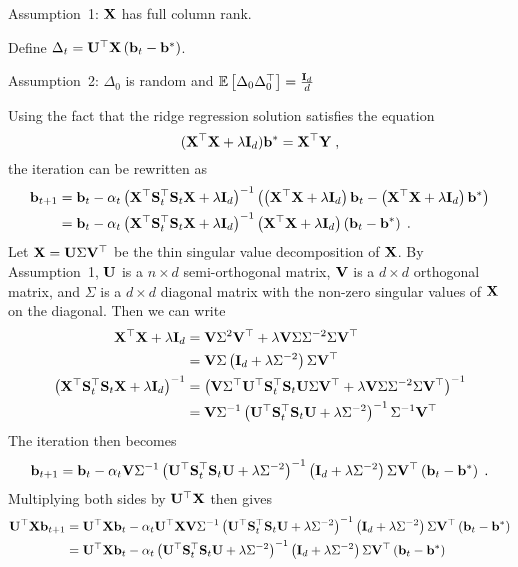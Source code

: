 \todo

Assumption~1: $\mathbf{X}$ has full column rank.

Define $\Delta_t=\mathbf{U}^\top\mathbf{X}\left(\mathbf{b}_t-\mathbf{b}^*\right)$.

Assumption~2: $\Delta_0$ is random and $\mathbb{E}\left[\Delta_0\Delta_0^\top\right]=\frac{\mathbf{I}_d}{d}$


Using the fact that the ridge regression solution satisfies the equation
\[
(\mathbf{X}^\top\mathbf{X} + \lambda\mathbf{I}_d)\mathbf{b}^* = \mathbf{X}^\top\mathbf{Y} \;,
\]
the \todo iteration can be rewritten as
\begin{align*}
\mathbf{b}_{t+1} &= \mathbf{b}_t - \alpha_t\left(\mathbf{X}^\top\mathbf{S}_t^\top\mathbf{S}_t\mathbf{X} + \lambda\mathbf{I}_d\right)^{-1}\left(\left(\mathbf{X}^\top\mathbf{X}+\lambda\mathbf{I}_d\right)\mathbf{b}_t-\left(\mathbf{X}^\top\mathbf{X}+\lambda\mathbf{I}_d\right)\mathbf{b}^*\right) \\
&= \mathbf{b}_t - \alpha_t\left(\mathbf{X}^\top\mathbf{S}_t^\top\mathbf{S}_t\mathbf{X} + \lambda\mathbf{I}_d\right)^{-1}\left(\mathbf{X}^\top\mathbf{X}+\lambda\mathbf{I}_d\right)\left(\mathbf{b}_t-\mathbf{b}^*\right) \;.
\end{align*}
Let $\mathbf{X} = \mathbf{U}\Sigma\mathbf{V}^\top$ be the thin singular value decomposition of $\mathbf{X}$. By Assumption~1, $\mathbf{U}$ is a $n\times d$ semi-orthogonal matrix, $\mathbf{V}$ is a $d\times d$ orthogonal matrix, and $\Sigma$ is a $d\times d$ diagonal matrix with the non-zero singular values of $\mathbf{X}$ on the diagonal. Then we can write
\begin{align*}
\mathbf{X}^\top\mathbf{X}+\lambda\mathbf{I}_d &= \mathbf{V}\Sigma^2\mathbf{V}^\top + \lambda \mathbf{V}\Sigma\Sigma^{-2}\Sigma\mathbf{V}^\top \\
&= \mathbf{V}\Sigma\left(\mathbf{I}_d + \lambda\Sigma^{-2}\right)\Sigma\mathbf{V}^\top \\
\left(\mathbf{X}^\top\mathbf{S}_t^\top\mathbf{S}_t\mathbf{X} + \lambda\mathbf{I}_d\right)^{-1} &= \left(\mathbf{V}\Sigma^\top\mathbf{U}^\top\mathbf{S}_t^\top\mathbf{S}_t\mathbf{U}\Sigma\mathbf{V}^\top + \lambda\mathbf{V}\Sigma\Sigma^{-2}\Sigma\mathbf{V}^\top\right)^{-1} \\
&= \mathbf{V}\Sigma^{-1}\left(\mathbf{U}^\top\mathbf{S}_t^\top\mathbf{S}_t\mathbf{U} + \lambda\Sigma^{-2}\right)^{-1}\Sigma^{-1}\mathbf{V}^\top
\end{align*}
The \todo iteration then becomes
\[
\mathbf{b}_{t+1} = \mathbf{b}_t - \alpha_t\mathbf{V}\Sigma^{-1}\left(\mathbf{U}^\top\mathbf{S}_t^\top\mathbf{S}_t\mathbf{U} + \lambda\Sigma^{-2}\right)^{-1}\left(\mathbf{I}_d + \lambda\Sigma^{-2} \right)\Sigma\mathbf{V}^\top\left(\mathbf{b}_t-\mathbf{b}^*\right) \;.
\]
Multiplying both sides by $\mathbf{U}^\top\mathbf{X}$ then gives
\begin{align*}
\mathbf{U}^\top\mathbf{X}\mathbf{b}_{t+1} &= \mathbf{U}^\top\mathbf{X}\mathbf{b}_t - \alpha_t\mathbf{U}^\top\mathbf{X}\mathbf{V}\Sigma^{-1}\left(\mathbf{U}^\top\mathbf{S}_t^\top\mathbf{S}_t\mathbf{U} + \lambda\Sigma^{-2}\right)^{-1}\left(\mathbf{I}_d + \lambda\Sigma^{-2} \right)\Sigma\mathbf{V}^\top\left(\mathbf{b}_t-\mathbf{b}^*\right) \\
&= \mathbf{U}^\top\mathbf{X}\mathbf{b}_t - \alpha_t\left(\mathbf{U}^\top\mathbf{S}_t^\top\mathbf{S}_t\mathbf{U} + \lambda\Sigma^{-2}\right)^{-1}\left(\mathbf{I}_d + \lambda\Sigma^{-2} \right)\Sigma\mathbf{V}^\top\left(\mathbf{b}_t-\mathbf{b}^*\right)
\end{align*}
